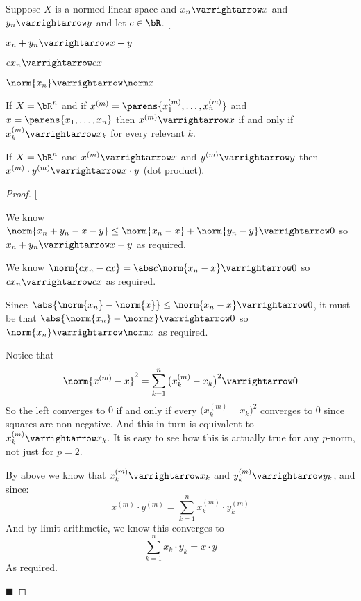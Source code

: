 \documentclass[10pt]{article}
\makeatletter
\def\@blist[#1]{%
    \bgroup\bgroup\par\vskip-\medskipamount%
    \gdef\item{%
        \par\egroup\bgroup\medskip\setbox0=\hbox{#1\quad}%
        \advance\leftskip by \wd0\leavevmode\kern-\wd0\box0%
    }%
}
\def\blist{\@ifnextchar[ \@blist {\@blist[$\bullet$]}}
\def\elist{\par\egroup\egroup\medskip}
\makeatother
\begin{document}
\begin{prop*}

    Suppose $X$ is a normed linear space and $x_n\varrightarrow x$ and $y_n\varrightarrow y$ and let $c\in\bR$.
    \blist
        \item $x_n+y_n\varrightarrow x+y$
        \item $cx_n\varrightarrow cx$
        \item $\norm{x_n}\varrightarrow\norm x$
        \item If $X=\bR^n$ and if $x^{(m)}=\parens{x_1^{(m)},\dots,x_n^{(m)}}$ and $x=\parens{x_1,\dots,x_n}$ then $x^{(m)}\varrightarrow x$ if and only if $x_k^{(m)}\varrightarrow x_k$ for every relevant
            $k$.
        \item If $X=\bR^n$ and $x^{(m)}\varrightarrow x$ and $y^{(m)}\varrightarrow y$ then $x^{(m)}\cdot y^{(m)}\varrightarrow x\cdot y$ (dot product).
    \elist

\end{prop*}

\begin{proof}

    \blist
        \item We know $\norm{x_n+y_n-x-y} \leq \norm{x_n-x} + \norm{y_n-y} \varrightarrow 0$ so $x_n+y_n\varrightarrow x+y$ as required.
        \item We know $\norm{cx_n - cx} = \abs c\norm{x_n-x} \varrightarrow 0$ so $cx_n\varrightarrow cx$ as required.
        \item Since $\abs{\norm{x_n}-\norm{x}}\leq\norm{x_n-x}\varrightarrow0$, it must be that $\abs{\norm{x_n}-\norm x}\varrightarrow0$ so $\norm{x_n}\varrightarrow\norm x$ as required.
        \item Notice that
                \[ \norm{x^{(m)}-x}^2 = \sum_{k=1}^n \big(x^{(m)}_k - x_k\big)^2 \varrightarrow 0 \]
            So the left converges to $0$ if and only if every $\big(x^{(m)}_k-x_k\big)^2$ converges to $0$ since squares are non-negative.
            And this in turn is equivalent to $x^{(m)}_k\varrightarrow x_k$.
            It is easy to see how this is actually true for any $p$-norm, not just for $p=2$.
        \item By above we know that $x^{(m)}_k\varrightarrow x_k$ and $y^{(m)}_k\varrightarrow y_k$, and since:
                \[ x^{(m)}\cdot y^{(m)} = \sum_{k=1}^n x^{(m)}_k\cdot y^{(m)}_k \]
            And by limit arithmetic, we know this converges to
                \[ \sum_{k=1}^n x_k\cdot y_k = x\cdot y \]
            As required.
    \elist

    \hfill$\blacksquare$

\end{proof}
\end{document}

